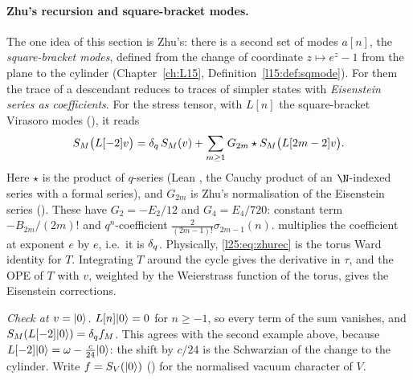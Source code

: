 \paragraph{Zhu's recursion and square-bracket modes.} The one idea of this section is Zhu's: there is a second set of
modes $a[n]$, the \emph{square-bracket modes}, defined from the change of coordinate $z\mapsto e^z-1$ from the plane to
the cylinder (Chapter~\ref{ch:L15}, Definition~\ref{l15:def:sqmode}). For them the trace of a descendant reduces to
traces of simpler states with \emph{Eisenstein series as coefficients}. For the stress tensor, with $L[n]$ the
square-bracket Virasoro modes (), it reads
\begin{equation}\label{l25:eq:zhurec}
S_M\big(L[-2]v\big)=\delta_q\,S_M(v)+\sum_{m\ge1}G_{2m}\star S_M\big(L[2m-2]v\big).
\end{equation}
Here $\star$ is the product of $q$-series (Lean , the Cauchy product of an $\N$-indexed series with a
formal series), and $G_{2m}$ is Zhu's normalisation of the Eisenstein series (). These have
$G_2=-E_2/12$ and $G_4=E_4/720$: constant term $-B_{2m}/(2m)!$ and $q^n$-coefficient $\frac{2}{(2m-1)!}\sigma_{2m-1}(n)$.
 multiplies the coefficient at exponent $e$ by $e$, i.e.\ it is $\delta_q$. Physically,
\eqref{l25:eq:zhurec} is the torus Ward identity for $T$. Integrating $T$ around the cycle gives the derivative in
$\tau$, and the OPE of $T$ with $v$, weighted by the Weierstrass function of the torus, gives the Eisenstein
corrections.

\emph{Check at $v=|0\rangle$.} $L[n]|0\rangle=0$ for $n\ge-1$, so every term of the sum vanishes, and
$S_M(L[-2]|0\rangle)=\delta_q f_M$. This agrees with the second example above, because
$L[-2]|0\rangle=\omega-\frac c{24}|0\rangle$: the shift by $c/24$ is the Schwarzian of the change to the
cylinder. Write $f=S_V(|0\rangle)$ () for the normalised vacuum character of $V$.

